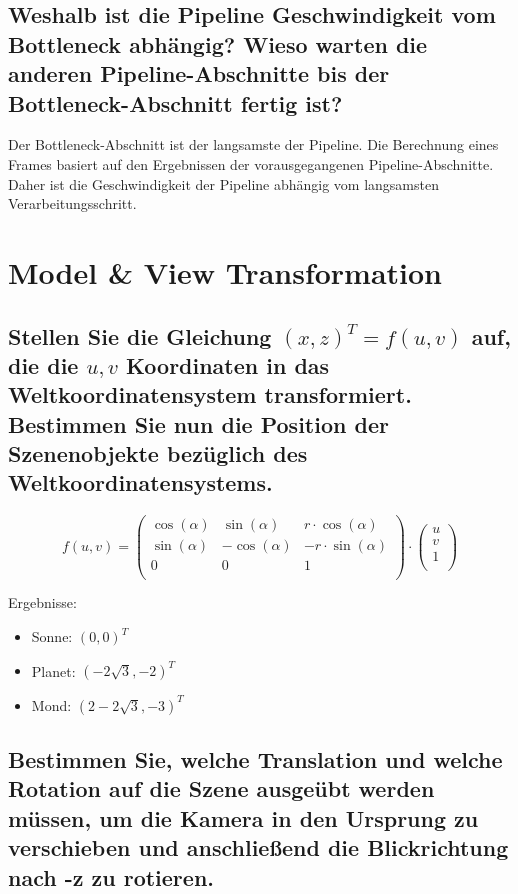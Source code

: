 \documentclass[a4paper,10pt,DIV=14]{scrartcl}
\begin{document}
\subsection{Weshalb ist die Pipeline Geschwindigkeit vom Bottleneck abhängig? Wieso warten die anderen Pipeline-Abschnitte bis der Bottleneck-Abschnitt fertig ist?}
Der Bottleneck-Abschnitt ist der langsamste der Pipeline. Die Berechnung eines Frames basiert auf den Ergebnissen der vorausgegangenen Pipeline-Abschnitte. Daher ist die Geschwindigkeit der Pipeline abhängig vom langsamsten Verarbeitungsschritt.


\section{Model \& View Transformation}

\subsection{Stellen Sie die Gleichung $(x, z)^T = f(u,v)$ auf, die die $u, v$ Koordinaten in das Weltkoordinatensystem transformiert. Bestimmen Sie nun die Position der Szenenobjekte bezüglich des Weltkoordinatensystems.}

$$f(u,v) = \begin{pmatrix}
\cos(\alpha) & \sin(\alpha)  & r \cdot \cos(\alpha)  \\
\sin(\alpha) & -\cos(\alpha) & -r \cdot \sin(\alpha) \\
0            & 0             & 1                     \\
\end{pmatrix} \cdot \begin{pmatrix} u \\ v \\ 1 \\ \end{pmatrix} $$

Ergebnisse:
\begin{itemize}[itemsep=0pt]
	\item Sonne: $ (0, 0)^T $
	\item Planet: $ (-2\sqrt{3}, -2)^T $
	\item Mond: $ (2 - 2\sqrt{3}, -3)^T $
\end{itemize}


\subsection{Bestimmen Sie, welche Translation und welche Rotation auf die Szene ausgeübt werden müssen, um die Kamera in den Ursprung zu verschieben und anschließend die Blickrichtung nach -z zu rotieren.}
\end{document}
